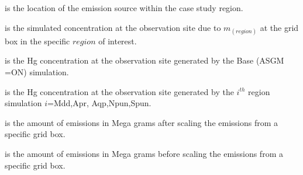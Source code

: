\begin{description}[leftmargin=!,labelwidth={5 em}]
    \item [$region$] is the location of the emission source within the case study region.
    \item [$Hg^0_{sig(region)}$] is the simulated \hg concentration at the observation site due to $m_{(region)}$ at the grid box in the specific $region $ of interest.
    \item [$Hg_{m_0}$] is the Hg concentration  at the observation site generated by the Base (ASGM =ON) simulation. 
    \item [$Hg_{m_1}$] is the Hg concentration  at the observation site generated by the $i^{th}$ region simulation $i$=Mdd,Apr, Aqp,Npun,Spun. 
    \item [$m_1$] is the amount of emissions in Mega grams after scaling the emissions from a specific grid box.
    \item [$m_0$] is the amount of emissions in Mega grams before scaling the emissions from a specific grid box.
\end{description}




    
    




